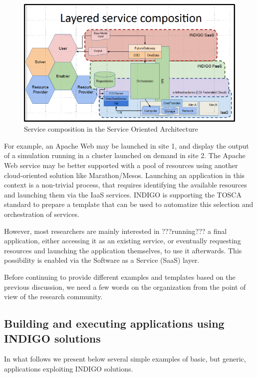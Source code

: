 \documentclass{article}
\begin{document}
\begin{figure}
  \centering
  \includegraphics[width=\textwidth]{./figs/Figure11.pdf}
  \caption{Service composition in the Service Oriented Architecture}
  \label{fig:11}
\end{figure}


For example, an Apache Web may be launched in site 1, and display the output of a simulation running in a cluster launched on demand in site 2. The Apache Web service may be better supported with a pool of resources using another cloud-oriented solution like Marathon/Mesos.   Launching an application in this context is a non-trivial process, that requires identifying the available resources and launching them via the IaaS services. INDIGO is supporting the TOSCA standard to prepare a template that can be used to automatize this selection and orchestration of services.

However, most researchers are mainly interested in ???running??? a final application, either accessing it as an existing service, or eventually requesting resources and launching the application themselves, to use it afterwards. This possibility is enabled via the Software as a Service (SaaS) layer.

Before continuing to provide different examples and templates based on the previous discussion, we need a few words on the organization from the point of view of the research community.

\subsection{Building and executing applications using INDIGO solutions}


In what follows we present below several simple examples of basic, but generic, applications exploiting INDIGO solutions. 
\end{document}
